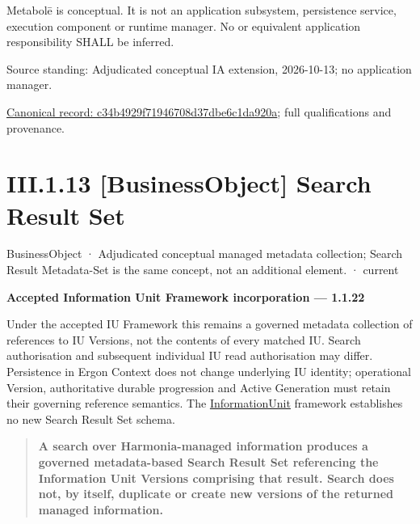 Metabolē is conceptual. It is not an application subsystem, persistence service,
execution component or runtime manager. No \texttt{} or equivalent
application responsibility SHALL be inferred.



Source standing: Adjudicated conceptual IA extension, 2026-10-13; no application manager.


{\footnotesize \href{../../../../../../../continuum/business/business-object/c34b4929f71946708d37dbe6c1da920a.md}{Canonical record: c34b4929f71946708d37dbe6c1da920a}; full qualifications and provenance.}\par
\section*{III.1.13 [BusinessObject] Search Result Set}
\label{navigation:III.1.13}

\label{element:b683ae87c72a4c16aba948a4b8cb0998}
{\small BusinessObject · Adjudicated conceptual managed metadata collection; Search Result Metadata-Set is the same concept, not an additional element. · current}\par

\par\medskip\textbf{Accepted Information Unit Framework incorporation — 1.1.22}\par


Under the accepted IU Framework this remains a governed metadata collection of references to IU Versions, not the contents of every matched IU. Search authorisation and subsequent individual IU read authorisation may differ. Persistence in Ergon Context does not change underlying IU identity; operational Version, authoritative durable progression and Active Generation must retain their governing reference semantics. The \hyperref[element:74ec609de1ae498fbf9d13e4ef8c6cbe]{InformationUnit} framework establishes no new Search Result Set schema.



\begin{quote}


\textbf{A search over Harmonia-managed information produces a governed
metadata-based Search Result Set referencing the Information Unit Versions
comprising that result. Search does not, by itself, duplicate or create new
versions of the returned managed information.}



\end{quote}


